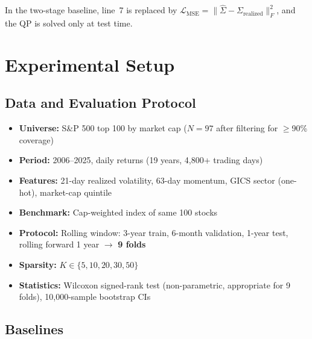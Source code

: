 \documentclass[11pt]{article}
\newcommand{\bSigma}{\hat{\Sigma}}
\newcommand{\cL}{\mathcal{L}}
\begin{document}
In the two-stage baseline, line~7 is replaced by $\cL_{\text{MSE}} = \|\bSigma - \Sigma_{\text{realized}}\|_F^2$, and the QP is solved only at test time.

\section{Experimental Setup}
\label{sec:setup}

\subsection{Data and Evaluation Protocol}

\begin{itemize}[nosep]
  \item \textbf{Universe:} S\&P 500 top 100 by market cap ($N{=}97$ after filtering for $\geq$90\% coverage)
  \item \textbf{Period:} 2006--2025, daily returns (19 years, 4{,}800+ trading days)
  \item \textbf{Features:} 21-day realized volatility, 63-day momentum, GICS sector (one-hot), market-cap quintile
  \item \textbf{Benchmark:} Cap-weighted index of same 100 stocks
  \item \textbf{Protocol:} Rolling window: 3-year train, 6-month validation, 1-year test, rolling forward 1 year $\to$ \textbf{9 folds}
  \item \textbf{Sparsity:} $K \in \{5, 10, 20, 30, 50\}$
  \item \textbf{Statistics:} Wilcoxon signed-rank test (non-parametric, appropriate for 9 folds), 10{,}000-sample bootstrap CIs
\end{itemize}

\subsection{Baselines}
\end{document}
